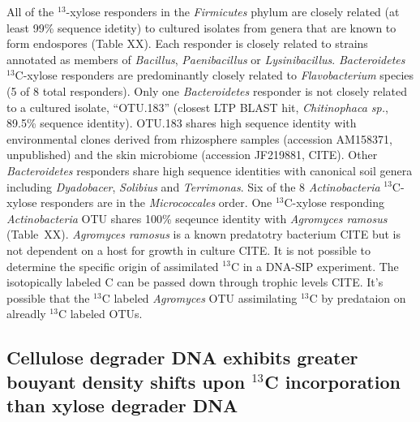 All of the $^{13}$-xylose responders in the \textit{Firmicutes} phylum are closely related
(at least 99\% sequence idetity) to cultured isolates from genera that are known to form 
endospores (Table XX). Each responder is closely related to strains annotated
as members of \textit{Bacillus}, \textit{Paenibacillus} or
\textit{Lysinibacillus}. \textit{Bacteroidetes} $^{13}$C-xylose responders are
predominantly closely related to \textit{Flavobacterium} species (5 of 8 total
responders). Only one \textit{Bacteroidetes} responder is not closely related
to a cultured isolate, ``OTU.183'' (closest LTP BLAST hit, \textit{Chitinophaca
sp.}, 89.5\% sequence identity). OTU.183 shares high sequence identity with
environmental clones derived from rhizosphere samples (accession AM158371,
unpublished) and the skin microbiome (accession JF219881, CITE). Other
\textit{Bacteroidetes} responders share high sequence identities with canonical
soil genera including \textit{Dyadobacer}, \textit{Solibius} and
\textit{Terrimonas}. Six of the 8 \textit{Actinobacteria} $^{13}$C-xylose responders
are in the \textit{Micrococcales} order. One $^{13}$C-xylose responding \textit{Actinobacteria}
OTU shares 100\% seqeunce identity with \textit{Agromyces ramosus} (Table~XX). 
\textit{Agromyces ramosus} is a known predatotry bacterium CITE but is not dependent
on a host for growth in culture CITE. It is not possible to determine the specific origin
of assimilated $^{13}$C in a DNA-SIP experiment. The isotopically labeled C can be passed 
down through trophic levels CITE. It's possible that the $^{13}$C labeled \textit{Agromyces} 
OTU assimilating $^{13}$C by predataion on alreadly $^{13}$C labeled OTUs.

\subsection{Cellulose degrader DNA exhibits greater bouyant density shifts upon $^{13}$C incorporation than xylose degrader DNA}
